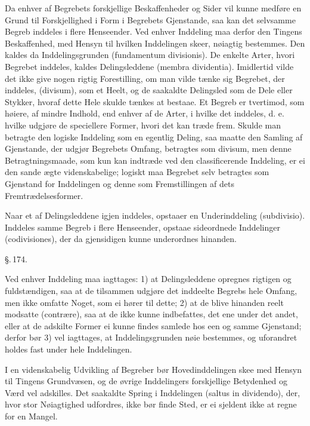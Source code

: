 \documentclass[12pt]{book}
\def\textit#1{#1}%
\def\emph#1{#1}%
\newcommand{\parag}[1]{%
  \par\vspace{0.9\baselineskip}%
  {\centering\textit{\S.\,#1.}\par}%
  \vspace{0.35\baselineskip}%
  \noindent\hspace{\parindent}\ignorespaces
}
\newcommand{\opage}[1]{\marginnote{\footnotesize\textit{[#1]}}}
\begin{document}
Da enhver af Begrebets forskjellige Beskaffenheder og Sider vil kunne
medføre en Grund til Forskjellighed i Form i Begrebets Gjenstande, saa kan
det selvsamme Begreb inddeles i flere Henseender. Ved enhver Inddeling maa
derfor den Tingens Beskaffenhed, med Hensyn til hvilken Inddelingen skeer,
nøiagtig bestemmes. Den kaldes da \emph{Inddelingsgrunden}
(\textit{fundamentum divisionis}). De enkelte Arter, hvori Begrebet
inddeles, kaldes \emph{Delingsleddene} (\textit{membra dividentia}).
Imidlertid vilde det ikke give nogen rigtig Forestilling, om man vilde tænke
sig Begrebet, der inddeles, (\textit{divisum}), som et Heelt, og de
saakaldte Delingsled som de Dele eller Stykker, hvoraf dette Hele skulde
tænkes at bestaae. Et Begreb er tvertimod, som høiere, af mindre Indhold,
end
\opage{376} enhver af de Arter, i hvilke det inddeles, d. e. hvilke udgjøre de
speciellere Former, hvori det kan træde frem. Skulde man betragte den
logiske Inddeling som en egentlig Deling, saa maatte den Samling af
Gjenstande, der udgjør Begrebets Omfang, betragtes som \textit{divisum}, men
denne Betragtningsmaade, som kun kan indtræde ved den classificerende
Inddeling, er ei den sande ægte videnskabelige; logiskt maa Begrebet selv
betragtes som Gjenstand for Inddelingen og denne som Fremstillingen af dets
Fremtrædelsesformer.

Naar et af Delingsleddene igjen inddeles, opstaaer en \emph{Underinddeling}
(\textit{subdivisio}). Inddeles samme Begreb i flere Henseender, opstaae
\emph{sideordnede Inddelinger} (\textit{codivisiones}), der da gjensidigen
kunne underordnes hinanden.

\parag{174}

Ved enhver Inddeling maa iagttages: 1) at Delingsleddene opregnes rigtigen
og fuldstændigen, saa at de tilsammen udgjøre det inddeelte Begrebs hele
Omfang, men ikke omfatte Noget, som ei hører til dette; 2) at de blive
hinanden reelt modsatte (\textit{contrære}), saa at de ikke kunne
indbefattes, det ene under det andet, eller at de adskilte Former ei kunne
findes samlede hos een og samme Gjenstand; derfor bør 3) vel iagttages, at
Inddelingsgrunden nøie bestemmes, og uforandret holdes fast under hele
Inddelingen.

I en videnskabelig Udvikling af Begreber bør \emph{Hovedinddelingen} skee
med Hensyn til Tingens
\opage{377} Grundvæsen, og de øvrige Inddelingers forskjellige Betydenhed og Værd vel
adskilles. Det saakaldte Spring i Inddelingen
(\textit{saltus in dividendo}), der, hvor stor Nøiagtighed udfordres, ikke
bør finde Sted, er ei sjeldent ikke at regne for en Mangel.
\end{document}
